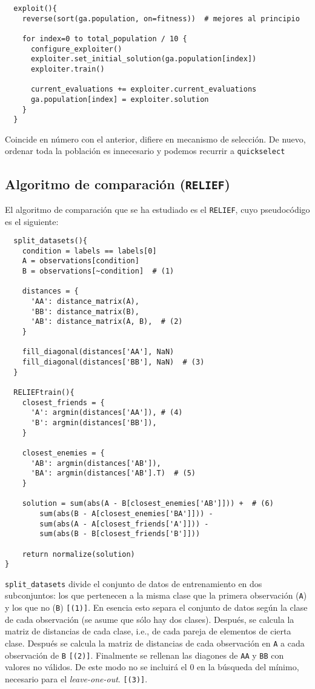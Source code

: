 \documentclass[11pt]{article}
\theoremstyle{plain}
\theoremstyle{definition}
\begin{document}
\begin{lstlisting}
  exploit(){
    reverse(sort(ga.population, on=fitness))  # mejores al principio

    for index=0 to total_population / 10 {
      configure_exploiter()
      exploiter.set_initial_solution(ga.population[index])
      exploiter.train()

      current_evaluations += exploiter.current_evaluations
      ga.population[index] = exploiter.solution
    }
  }
\end{lstlisting}

Coincide en número con el anterior, difiere en mecanismo de selección.
De nuevo, ordenar toda la población es innecesario y podemos recurrir a \texttt{quickselect} \\

\subsection{Algoritmo de comparación (\texttt{RELIEF})}

El algoritmo de comparación que se ha estudiado es el \texttt{RELIEF}, cuyo pseudocódigo es el siguiente:

\begin{lstlisting}
  split_datasets(){
    condition = labels == labels[0]
    A = observations[condition]
    B = observations[~condition]  # (1)

    distances = {
      'AA': distance_matrix(A),
      'BB': distance_matrix(B),
      'AB': distance_matrix(A, B),  # (2)
    }

    fill_diagonal(distances['AA'], NaN)
    fill_diagonal(distances['BB'], NaN)  # (3)
  }

  RELIEFtrain(){
    closest_friends = {
      'A': argmin(distances['AA']), # (4)
      'B': argmin(distances['BB']),
    }

    closest_enemies = {
      'AB': argmin(distances['AB']),
      'BA': argmin(distances['AB'].T)  # (5)
    }

    solution = sum(abs(A - B[closest_enemies['AB']])) +  # (6)
        sum(abs(B - A[closest_enemies['BA']])) -
        sum(abs(A - A[closest_friends['A']])) -
        sum(abs(B - B[closest_friends['B']]))

    return normalize(solution)
}
\end{lstlisting}

\texttt{split\_datasets} divide el conjunto de datos de entrenamiento en dos subconjuntos: los que pertenecen a la misma clase que la primera observación (\texttt{A}) y los que no (\texttt{B}) \texttt{[(1)]}. En esencia esto separa el conjunto de datos según la clase de cada observación (se asume que sólo hay dos clases). Después, se calcula la matriz de distancias de cada clase, i.e., de cada pareja de elementos de cierta clase. Después se calcula la matriz de distancias de cada observación en \texttt{A} a cada observación de \texttt{B} \texttt{[(2)]}. Finalmente se rellenan las diagones de \texttt{AA} y \texttt{BB} con valores no válidos. De este modo no se incluirá el 0 en la búsqueda del mínimo, necesario para el \textit{leave-one-out}. \texttt{[(3)]}. \\
\end{document}
